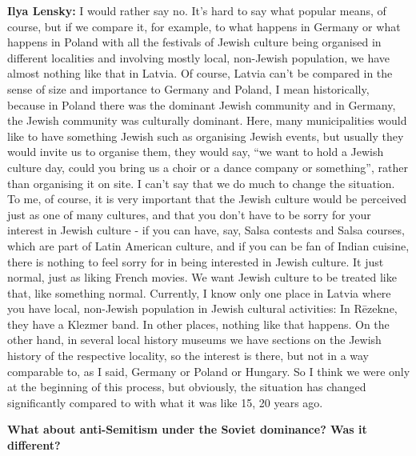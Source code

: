 \textbf{Ilya Lensky:} I would rather say no. It’s hard to say what popular means, of course, but if we compare it, for example, to what happens in Germany or what happens in Poland with all the festivals of Jewish culture being organised in different localities and involving mostly local, non-Jewish population, we have almost nothing like that in Latvia. Of course, Latvia can’t be compared in the sense of size and importance to Germany and Poland, I mean historically, because in Poland there was the dominant Jewish community and in Germany, the Jewish community was culturally dominant. Here, many municipalities would like to have something Jewish such as organising Jewish events, but usually they would invite us to organise them, they would say, ``we want to hold a Jewish culture day, could you bring us a choir or a dance company or something'', rather than organising it on site. I can’t say that we do much to change the situation. To me, of course, it is very important that the Jewish culture would be perceived just as one of many cultures, and that you don’t have to be sorry for your interest in Jewish culture - if you can have, say, Salsa contests and Salsa courses, which are part of Latin American culture, and if you can be fan of Indian cuisine, there is nothing to feel sorry for in being interested in Jewish culture. It just normal, just as liking French movies. We want Jewish culture to be treated like that, like something normal. Currently, I know only one place in Latvia where you have local, non-Jewish population in Jewish cultural activities: In Rēzekne, they have a Klezmer band. In other places, nothing like that happens. On the other hand, in several local history museums we have sections on the Jewish history of the respective locality, so the interest is there, but not in a way comparable to, as I said, Germany or Poland or Hungary. So I think we were only at the beginning of this process, but obviously, the situation has changed significantly compared to with what it was like 15, 20 years ago. 

\textbf{What about anti-Semitism under the Soviet dominance? Was it different?}

